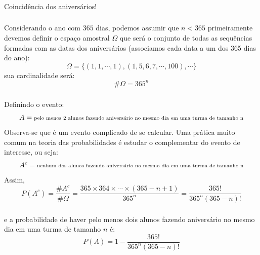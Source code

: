 \documentclass[14pt,aspectratio=1610]{beamer}
\begin{document}
\begin{frame}[fragile]{}
\frametitle{}
\begin{block}{}
\centering
Coincidência dos aniversários!
\end{block}
\end{frame}

\begin{frame}{}
\frametitle{}
\begin{block}{}
\justifying
Considerando o ano com $365$ dias, podemos assumir que $n<365$ primeiramente devemos definir o espaço amostral $\Omega$ que será o conjunto de todas as sequências formadas com as datas dos aniversários (associamos cada data a um dos 365 dias do ano):
$$\Omega=\{(1,1,\cdots,1),(1,5,6,7,\cdots,100),\cdots\}$$
sua cardinalidade será: $$\# \Omega=365^{n}$$

\end{block}
\end{frame}

\begin{frame}{}
\frametitle{}
\begin{block}{}
\justifying
Definindo o evento:
$${\scriptsize A=\textrm{pelo menos 2 alunos fazendo aniversário no mesmo dia em uma turma de tamanho n}}$$
Observa-se que é um evento complicado de se calcular. Uma prática muito comum na teoria das probabilidades é estudar o complementar do evento de interesse, ou seja:
$${\scriptsize A^{c}=\textrm{nenhum dos alunos fazendo aniversário no mesmo dia em uma turma de tamanho n}}$$
Assim, 
$$P(A^{c})=\dfrac{\# A^{c}}{\# \Omega}=\dfrac{365\times 364\times \cdots \times (365-n+1)}{365^{n}}=\dfrac{365!}{365^{n}(365-n)!}$$
\end{block}
\end{frame}

\begin{frame}{}
\frametitle{}
\begin{block}{}
\justifying
e a probabilidade de haver pelo menos dois alunos fazendo aniversário no mesmo dia em uma turma de tamanho $n$ é:
$$P(A)=1-\dfrac{365!}{365^{n}(365-n)!}$$


\end{block}
\end{frame}
\end{document}
